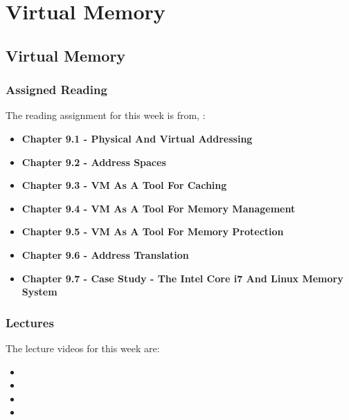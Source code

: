\clearpage

\renewcommand{\ChapTitle}{Virtual Memory}
\renewcommand{\SectionTitle}{Virtual Memory}
\chapter{\ChapTitle}

\section{\SectionTitle}

\subsection{Assigned Reading}

The reading assignment for this week is from, \Textbook:

\begin{itemize}
    \item \textbf{Chapter 9.1 - Physical And Virtual Addressing}
    \item \textbf{Chapter 9.2 - Address Spaces}
    \item \textbf{Chapter 9.3 - VM As A Tool For Caching}
    \item \textbf{Chapter 9.4 - VM As A Tool For Memory Management}
    \item \textbf{Chapter 9.5 - VM As A Tool For Memory Protection}
    \item \textbf{Chapter 9.6 - Address Translation}
    \item \textbf{Chapter 9.7 - Case Study - The Intel Core i7 And Linux Memory System}
\end{itemize}

\subsection{Lectures}

The lecture videos for this week are:

\begin{itemize}
    \item {}
    \item {}
    \item {}
    \item {}
\end{itemize}

